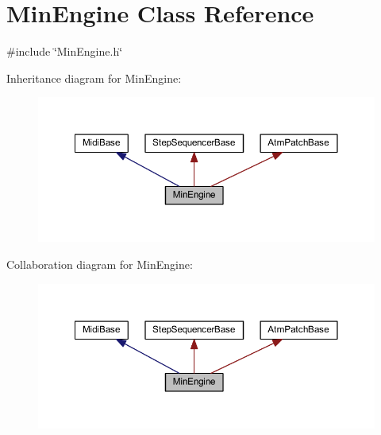 \hypertarget{class_min_engine}{}\section{Min\+Engine Class Reference}
\label{class_min_engine}


{\ttfamily \#include \char`\"{}Min\+Engine.\+h\char`\"{}}



Inheritance diagram for Min\+Engine\+:
\nopagebreak
\begin{figure}[H]
\begin{center}
\leavevmode
\includegraphics[width=350pt]{class_min_engine__inherit__graph}
\end{center}
\end{figure}


Collaboration diagram for Min\+Engine\+:
\nopagebreak
\begin{figure}[H]
\begin{center}
\leavevmode
\includegraphics[width=350pt]{class_min_engine__coll__graph}
\end{center}
\end{figure}
